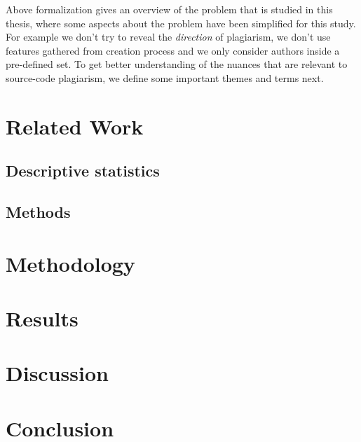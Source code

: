 \documentclass[english, grading]{tktltiki2}
\theoremstyle{definition}
\theoremstyle{remark}
\numberwithin{equation}{section} %
\begin{document}
Above formalization gives an overview of the problem that is studied in this thesis, where some aspects about the problem have been simplified for this study. For example we don't try to reveal the \emph{direction} of plagiarism, we don't use features gathered from creation process and we only consider authors inside a pre-defined set. To get better understanding of the nuances that are relevant to source-code plagiarism, we define some important themes and terms next.



\newpage

\section{Related Work} \label{chap-liter-review}


\subsection{Descriptive statistics} \label{subsec-liter-data}


\subsection{Methods} \label{chap-liter-review-methods}


%


\section{Methodology}


\section{Results}

\section{Discussion}


\section{Conclusion}
\end{document}
